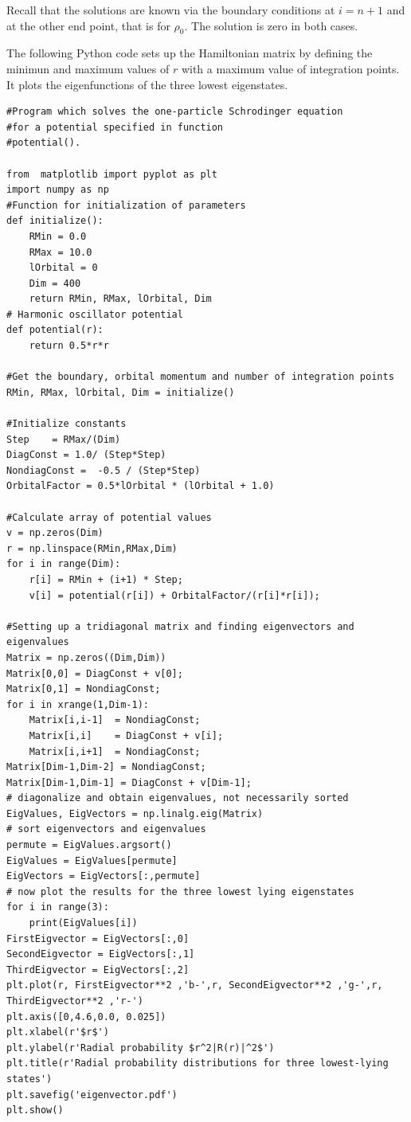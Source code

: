 \documentclass[graybox,envcountchap,sectrefs]{svmult}
\begin{document}
Recall that the solutions are known via the boundary conditions at
$i={n+1}$ and at the other end point, that is for  $\rho_0$.
The solution is zero in both cases.


The following Python code sets up the Hamiltonian matrix by defining
the minimun and maximum values of $r$ with a maximum value of
integration points. It plots the eigenfunctions of the three lowest
eigenstates.
\begin{lstlisting}
#Program which solves the one-particle Schrodinger equation
#for a potential specified in function
#potential().

from  matplotlib import pyplot as plt
import numpy as np
#Function for initialization of parameters
def initialize():
    RMin = 0.0
    RMax = 10.0
    lOrbital = 0
    Dim = 400
    return RMin, RMax, lOrbital, Dim
# Harmonic oscillator potential
def potential(r):
    return 0.5*r*r

#Get the boundary, orbital momentum and number of integration points
RMin, RMax, lOrbital, Dim = initialize()

#Initialize constants
Step    = RMax/(Dim)
DiagConst = 1.0/ (Step*Step)
NondiagConst =  -0.5 / (Step*Step)
OrbitalFactor = 0.5*lOrbital * (lOrbital + 1.0)

#Calculate array of potential values
v = np.zeros(Dim)
r = np.linspace(RMin,RMax,Dim)
for i in range(Dim):
    r[i] = RMin + (i+1) * Step;
    v[i] = potential(r[i]) + OrbitalFactor/(r[i]*r[i]);

#Setting up a tridiagonal matrix and finding eigenvectors and eigenvalues
Matrix = np.zeros((Dim,Dim))
Matrix[0,0] = DiagConst + v[0];
Matrix[0,1] = NondiagConst;
for i in xrange(1,Dim-1):
    Matrix[i,i-1]  = NondiagConst;
    Matrix[i,i]    = DiagConst + v[i];
    Matrix[i,i+1]  = NondiagConst;
Matrix[Dim-1,Dim-2] = NondiagConst;
Matrix[Dim-1,Dim-1] = DiagConst + v[Dim-1];
# diagonalize and obtain eigenvalues, not necessarily sorted
EigValues, EigVectors = np.linalg.eig(Matrix)
# sort eigenvectors and eigenvalues
permute = EigValues.argsort()
EigValues = EigValues[permute]
EigVectors = EigVectors[:,permute]
# now plot the results for the three lowest lying eigenstates
for i in range(3):
    print(EigValues[i])
FirstEigvector = EigVectors[:,0]
SecondEigvector = EigVectors[:,1]
ThirdEigvector = EigVectors[:,2]
plt.plot(r, FirstEigvector**2 ,'b-',r, SecondEigvector**2 ,'g-',r, ThirdEigvector**2 ,'r-')
plt.axis([0,4.6,0.0, 0.025])
plt.xlabel(r'$r$')
plt.ylabel(r'Radial probability $r^2|R(r)|^2$')
plt.title(r'Radial probability distributions for three lowest-lying states')
plt.savefig('eigenvector.pdf')
plt.show()
\end{lstlisting}
\end{document}
